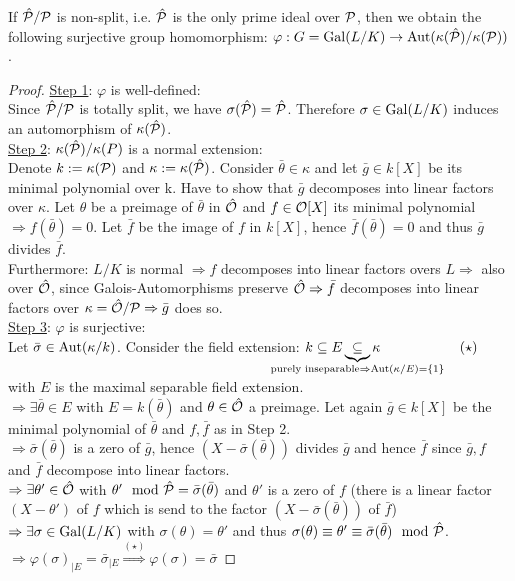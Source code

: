 
\begin{Prop}
If $\hat{\mathcal{P}}/\mathcal{P}$ is non-split, i.e. $\hat{\mathcal{P}}$ is the only prime ideal over $\mathcal{P}$, then we obtain the following surjective group homomorphism: $\varphi: G = \operatorname{Gal}(L/K) \to \operatorname{Aut}(\kappa(\hat{\mathcal{P}})/\kappa(\mathcal{P}))$.
\end{Prop}

\begin{proof}
\underline{Step 1}: $\varphi$ is well-defined:\\
Since $\hat{\mathcal{P}}/\mathcal{P}$ is totally split, we have $\sigma(\hat{\mathcal{P}})=\hat{\mathcal{P}}$. Therefore $\sigma \in \operatorname{Gal}(L/K)$ induces an automorphism of $\kappa(\hat{\mathcal{P}})$.\\
\underline{Step 2}: $\kappa(\hat{\mathcal{P}})/\kappa(P)$ is a normal extension:\\
Denote $k:=\kappa(\mathcal{P})$ and $\kappa:=\kappa(\hat{\mathcal{P}})$. Consider $\bar{\theta} \in \kappa$ and let $\bar{g} \in k[X]$ be its minimal polynomial over k. Have to show that $\bar{g}$ decomposes into linear factors over $\kappa$.
 Let $\theta$ be a preimage of $\bar{\theta}$ in $\hat{\mathcal{O}}$ and $f \in \mathcal{O}[X]$ its minimal polynomial $\Rightarrow f(\bar{\theta})=0$. Let $\bar{f}$ be the image of $f$ in $k[X]$, hence $\bar{f}(\bar{\theta})=0$ and thus $\bar{g}$ divides $\bar{f}$.\\
 Furthermore: $L/K$ is normal $\Rightarrow f$ decomposes into linear factors overs $L \Rightarrow$ also over $\hat{\mathcal{O}}$, since Galois-Automorphisms preserve $\hat{\mathcal{O}} \Rightarrow \bar{f}$ decomposes into linear factors over $\kappa=\hat{\mathcal{O}}/\mathcal{P} \Rightarrow \bar{g}$ does so.\\
 \underline{Step 3}: $\varphi$ is surjective:\\
Let $\bar{\sigma} \in \operatorname{Aut}(\kappa/k)$. Consider the field extension: $k \subseteq E \underbrace{\subseteq}_{\mathclap{\text{purely inseparable} \Rightarrow \Aut(\kappa/E)=\{1\}}} \kappa \hspace*{2cm} (\star)$\\
 with $E$ is the maximal separable field extension.\\
 $\Rightarrow \exists \bar{\theta} \in E$ with $E=k(\bar{\theta})$ and $\theta \in \hat{\mathcal{O}}$ a preimage. Let again $\bar{g} \in k[X]$ be the minimal polynomial of $\bar{\theta}$ and $f,\bar{f}$ as in Step 2.\\
 $\Rightarrow \bar{\sigma}(\bar{\theta})$ is a zero of $\bar{g}$, hence $(X-\bar{\sigma}(\bar{\theta}))$ divides $\bar{g}$ and hence $\bar{f}$ since $\bar{g}, f$ and $\bar{f}$ decompose into linear factors.\\
 $\Rightarrow \exists \theta' \in \hat{\mathcal{O}}$ with $\theta' \mod {\hat{\mathcal{P}}} = \bar{\sigma}(\bar{\theta})$ and $\theta'$ is a zero of $f$ (there is a linear factor $(X-\theta')$ of $f$ which is send to the factor $(X-\bar{\sigma}(\bar{\theta}))$ of $\bar{f}$)\\
 $\Rightarrow \exists \sigma \in \operatorname{Gal}(L/K)$ with $\sigma(\theta)=\theta'$ and thus $\sigma(\theta)\equiv \theta'\equiv \bar{\sigma}(\bar{\theta}) \mod {\hat{\mathcal{P}}}$.\\
 $\Rightarrow \varphi(\sigma)_{|E} = \bar{\sigma}_{|E} \stackrel{(\star)}{\Rightarrow} \varphi(\sigma)=\bar{\sigma}$
\end{proof}


